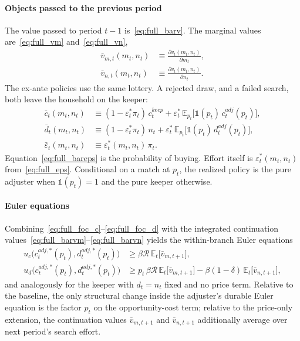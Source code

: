 \paragraph{Objects passed to the previous period}
The value passed to period $t-1$ is~\eqref{eq:full_barv}. The marginal values are~\eqref{eq:full_vm} and~\eqref{eq:full_vn},
\begin{align}
	\bar v_{m,t}(m_t,n_t)
	&\equiv \frac{\partial v_t(m_t,n_t)}{\partial m_t}, \label{eq:full_barvm}\\
	\bar v_{n,t}(m_t,n_t)
	&\equiv \frac{\partial v_t(m_t,n_t)}{\partial n_t}. \label{eq:full_barvn}
\end{align}
The ex-ante policies use the same lottery. A rejected draw, and a failed search, both leave the household on the keeper:
\begin{align}
	\bar c_t(m_t,n_t)
	&\equiv (1-\varepsilon_t^\ast\pi_t)\, c_t^{keep}
	+ \varepsilon_t^\ast\, \mathbb{E}_{p_t}\big[\mathbb{1}(p_t)\, c_t^{adj}(p_t)\big], \label{eq:full_barc}\\
	\bar d_t(m_t,n_t)
	&\equiv (1-\varepsilon_t^\ast\pi_t)\, n_t
	+ \varepsilon_t^\ast\, \mathbb{E}_{p_t}\big[\mathbb{1}(p_t)\, d_t^{adj}(p_t)\big], \label{eq:full_bard}\\
	\bar\varepsilon_t(m_t,n_t)
	&\equiv \varepsilon_t^\ast(m_t,n_t)\,\pi_t. \label{eq:full_bareps}
\end{align}
Equation~\eqref{eq:full_bareps} is the probability of buying. Effort itself is $\varepsilon_t^\ast(m_t,n_t)$ from~\eqref{eq:full_eps}. Conditional on a match at $p_t$, the realized policy is the pure adjuster when $\mathbb{1}(p_t)=1$ and the pure keeper otherwise.

\paragraph{Euler equations}
Combining~\eqref{eq:full_foc_c}--\eqref{eq:full_foc_d} with the integrated continuation values~\eqref{eq:full_barvm}--\eqref{eq:full_barvn} yields the within-branch Euler equations
\begin{align}
	u_c\big(c_t^{adj,\ast}(p_t),d_t^{adj,\ast}(p_t)\big)
	&\ge \beta \mathcal{R}\, \mathbb{E}_t\big[\bar v_{m,t+1}\big], \\
	u_d\big(c_t^{adj,\ast}(p_t),d_t^{adj,\ast}(p_t)\big)
	&\ge p_t\,\beta \mathcal{R}\, \mathbb{E}_t\big[\bar v_{m,t+1}\big]
	- \beta(1-\delta)\,\mathbb{E}_t\big[\bar v_{n,t+1}\big],
\end{align}
and analogously for the keeper with $d_t=n_t$ fixed and no price term. Relative to the baseline, the only structural change inside the adjuster's durable Euler equation is the factor $p_t$ on the opportunity-cost term; relative to the price-only extension, the continuation values $\bar v_{m,t+1}$ and $\bar v_{n,t+1}$ additionally average over next period's search effort.

